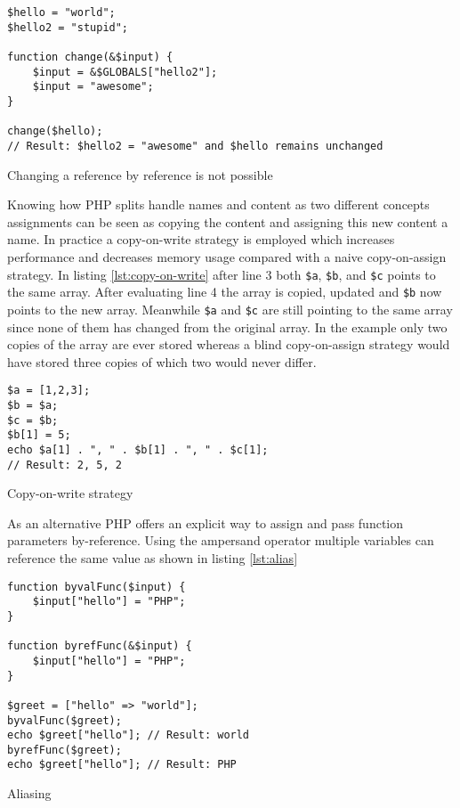 \begin{program}
\begin{lstlisting}
$hello = "world";
$hello2 = "stupid";

function change(&$input) {
    $input = &$GLOBALS["hello2"];
    $input = "awesome";
}

change($hello);
// Result: $hello2 = "awesome" and $hello remains unchanged
\end{lstlisting}
\caption{Changing a reference by reference is not possible}
\label{lst:reference-reference}
\end{program}

Knowing how PHP splits handle names and content as two different concepts assignments can be seen as copying the content and assigning this new content a name. In practice a copy-on-write strategy is employed which increases performance and decreases memory usage compared with a naive copy-on-assign strategy. In listing \ref{lst:copy-on-write} after line 3 both \texttt{\$a}, \texttt{\$b}, and \texttt{\$c} points to the same array. After evaluating line 4 the array is copied, updated and \texttt{\$b} now points to the new array. Meanwhile \texttt{\$a} and \texttt{\$c} are still pointing to the same array since none of them has changed from the original array. In the example only two copies of the array are ever stored whereas a blind copy-on-assign strategy would have stored three copies of which two would never differ.

\begin{program}
\begin{lstlisting}
$a = [1,2,3];
$b = $a;
$c = $b;
$b[1] = 5;
echo $a[1] . ", " . $b[1] . ", " . $c[1];
// Result: 2, 5, 2
\end{lstlisting}
\caption{Copy-on-write strategy}
\label{lst:copy-on-write}
\end{program}

As an alternative PHP offers an explicit way to assign and pass function parameters by-reference. Using the ampersand operator multiple variables can reference the same value as shown in listing \ref{lst:alias}

\begin{program}
\begin{lstlisting}
function byvalFunc($input) {
    $input["hello"] = "PHP";
}

function byrefFunc(&$input) {
    $input["hello"] = "PHP";
}

$greet = ["hello" => "world"];
byvalFunc($greet);
echo $greet["hello"]; // Result: world
byrefFunc($greet);
echo $greet["hello"]; // Result: PHP
\end{lstlisting}
\caption{Aliasing}
\label{lst:alias}
\end{program}

